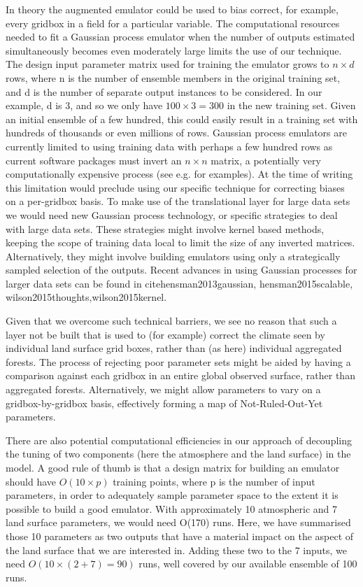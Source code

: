 \documentclass[gmd, manuscript]{copernicus}
\begin{document}
In theory the augmented emulator could be used to bias correct, for example, every gridbox in a field for a particular variable. The computational resources needed to fit a Gaussian process emulator when the number of outputs estimated simultaneously becomes even moderately large limits the use of our technique. The design input parameter matrix used for training the emulator grows to $n \times d$ rows, where n is the number of ensemble members in the original training set, and d is the number of separate output instances to be considered. In our example, d is 3, and so we only have $100 \times 3 = 300$ in the new training set. Given an initial ensemble of a few hundred, this could easily result in a training set with hundreds of thousands or even millions of rows. Gaussian process emulators are currently limited to using training data with perhaps a few hundred rows as current software packages must invert an $n \times n$ matrix, a potentially very computationally expensive process (see e.g. \cite{hensman2013gaussian} for examples). At the time of writing this limitation would preclude using our specific technique for correcting biases on a per-gridbox basis. To make use of the translational layer for large data sets we would need new Gaussian process technology, or specific strategies to deal with large data sets. These strategies might involve kernel based methods, keeping the scope of training data local to limit the size of any inverted matrices. Alternatively, they might involve building emulators using only a strategically sampled selection of the outputs. Recent advances in using Gaussian processes for larger data sets can be found in cite{hensman2013gaussian, hensman2015scalable, wilson2015thoughts,wilson2015kernel}.

Given that we overcome such technical barriers, we see no reason that such a layer not be built that is used to (for example) correct the climate seen by individual land surface grid boxes, rather than (as here) individual aggregated forests. The process of rejecting poor parameter sets might be aided by having a comparison against each gridbox in an entire global observed surface, rather than aggregated forests. Alternatively, we might allow parameters to vary on a gridbox-by-gridbox basis, effectively forming a map of Not-Ruled-Out-Yet parameters. 

There are also potential computational efficiencies in our approach of decoupling the tuning of two components (here the atmosphere and the land surface) in the model. A good rule of thumb is that a design matrix for building an emulator should have $O(10 \times p)$ training points, where p is the number of input parameters, in order to adequately sample parameter space to the extent it is possible to build a good emulator. With approximately 10 atmospheric and 7 land surface parameters, we would need O(170) runs. Here, we have summarised those 10 parameters as two outputs that have a material impact on the aspect of the land surface that we are interested in. Adding these two to the 7 inputs, we need $O(10 \times (2+7) = 90)$ runs, well covered by our available ensemble of 100 runs. 
\end{document}
